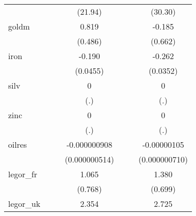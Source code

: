 {\begin{tabular}{l*{6}{c}}
            &                     &                     &     (21.94)         &                     &                     &     (30.30)         \\
[1em]
goldm       &                     &                     &       0.819         &                     &                     &      -0.185         \\
            &                     &                     &     (0.486)         &                     &                     &     (0.662)         \\
[1em]
iron        &                     &                     &      -0.190\sym{**} &                     &                     &      -0.262\sym{***}\\
            &                     &                     &    (0.0455)         &                     &                     &    (0.0352)         \\
[1em]
silv        &                     &                     &           0         &                     &                     &           0         \\
            &                     &                     &         (.)         &                     &                     &         (.)         \\
[1em]
zinc        &                     &                     &           0         &                     &                     &           0         \\
            &                     &                     &         (.)         &                     &                     &         (.)         \\
[1em]
oilres      &                     &                     &-0.000000908         &                     &                     & -0.00000105         \\
            &                     &                     &(0.000000514)         &                     &                     &(0.000000710)         \\
[1em]
legor\_fr    &                     &                     &       1.065         &                     &                     &       1.380         \\
            &                     &                     &     (0.768)         &                     &                     &     (0.699)         \\
[1em]
legor\_uk    &                     &                     &       2.354\sym{**} &                     &                     &       2.725\sym{***}\\

\end{tabular}}
